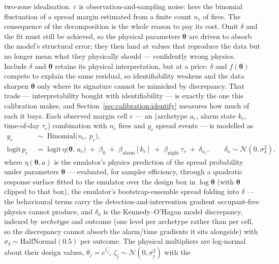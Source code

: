 \documentclass[11pt]{article}
\begin{document}
two-zone idealisation. $\varepsilon$ is observation-and-sampling noise: here the
binomial fluctuation of a spread margin estimated from a finite count $n_c$ of
fires. The consequence of the decomposition is the whole reason to pay its cost.
Omit $\delta$ and the fit must still be achieved, so the physical parameters
$\boldsymbol\theta$ are driven to absorb the model's structural error; they then
land at values that reproduce the data but no longer mean what they physically
should --- confidently wrong physics. Include $\delta$ and $\boldsymbol\theta$
retains its physical interpretation, but at a price: $\delta$ and
$f(\boldsymbol\theta)$ compete to explain the same residual, so identifiability
weakens and the data sharpen $\boldsymbol\theta$ only where its signature cannot
be mimicked by discrepancy. That trade --- interpretability bought with
identifiability --- is exactly the one this calibration makes, and
Section~\ref{sec:calibration:identify} measures how much of each it buys.
Each observed margin cell $c$ ---
an (archetype $a_c$, alarm state $k_c$, time-of-day $\tau_c$) combination with
$n_c$ fires and $y_c$ spread events --- is modelled as
\begin{align}
  y_c &\;\sim\; \mathrm{Binomial}\big(n_c,\, p_c\big),
  \label{eq:koh-lik}\\
  \mathrm{logit}\, p_c &\;=\;
  \mathrm{logit}\, \eta\big(\boldsymbol\theta,\, a_c\big)
  \;+\; \beta_0
  \;+\; \beta_{\mathrm{alarm}}[k_c]
  \;+\; \beta_{\mathrm{night}}\, \tau_c
  \;+\; \delta_{a_c} ,
  \qquad \delta_{a} \sim \mathcal{N}(0, \sigma_\delta^2),
  \label{eq:koh}
\end{align}
where $\eta(\boldsymbol\theta, a)$ is the emulator's physics prediction of the
spread probability under parameters $\boldsymbol\theta$ --- evaluated, for
sampler efficiency, through a quadratic response surface fitted to the emulator
over the design box in $\log\boldsymbol\theta$ (with $\boldsymbol\theta$
clipped to that box), the emulator's bootstrap-ensemble spread folding into
$\delta$ --- the behavioural terms carry the detection-and-intervention
gradient occupant-free physics cannot produce, and $\delta_{a}$ is the
Kennedy--O'Hagan model discrepancy, indexed by \emph{archetype} and outcome
(one level per archetype rather than per cell, so the discrepancy cannot
absorb the alarm/time gradients it sits alongside) with
$\sigma_\delta \sim \mathrm{HalfNormal}(0.5)$ per outcome. The physical
multipliers are log-normal about their design values,
$\theta_j = e^{\zeta_j}$, $\zeta_j \sim \mathcal{N}(0, \sigma_j^2)$ with the
\end{document}
